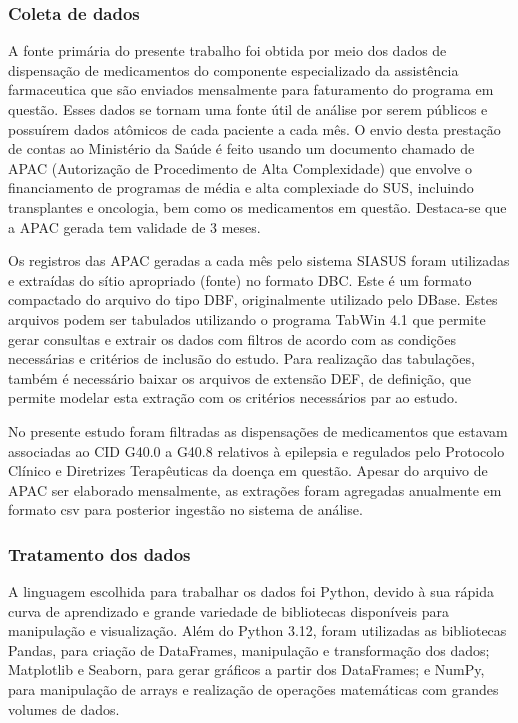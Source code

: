 \documentclass[article,a4paper,12pt,brazil,sumario=tradicional]{abntex2}
\begin{document}
\subsubsection{Coleta de dados}

A fonte primária do presente trabalho foi obtida por meio dos dados de dispensação de medicamentos do componente especializado da assistência farmaceutica que são enviados mensalmente para faturamento do programa em questão. Esses dados se tornam uma fonte útil de análise por serem públicos e possuírem dados atômicos de cada paciente a cada mês. O envio desta prestação de contas ao Ministério da Saúde é feito usando um documento chamado de APAC (Autorização de Procedimento de Alta Complexidade) que envolve o financiamento de programas de média e alta complexiade do SUS, incluindo transplantes e oncologia, bem como os medicamentos em questão. Destaca-se que a APAC gerada tem validade de 3 meses.

Os registros das APAC geradas a cada mês pelo sistema SIASUS foram utilizadas e extraídas do sítio apropriado (fonte) no formato DBC. Este é um formato compactado do arquivo do tipo DBF, originalmente utilizado pelo DBase. Estes arquivos podem ser tabulados utilizando o programa TabWin 4.1 que permite gerar consultas e extrair os dados com filtros de acordo com as condições necessárias e critérios de inclusão do estudo. Para realização das tabulações, também é necessário baixar os arquivos de extensão DEF, de definição, que permite modelar esta extração com os critérios necessários par ao estudo.

No presente estudo foram filtradas as dispensações de medicamentos que estavam associadas ao CID G40.0 a G40.8 relativos à epilepsia e regulados pelo Protocolo Clínico e Diretrizes Terapêuticas da doença em questão. Apesar do arquivo de APAC ser elaborado mensalmente, as extrações foram agregadas anualmente em formato csv para posterior ingestão no sistema de análise.

\subsubsection{Tratamento dos dados}
 
A linguagem escolhida para trabalhar os dados foi Python, devido à sua rápida curva de aprendizado e grande variedade de bibliotecas disponíveis para manipulação e visualização. Além do Python 3.12, foram utilizadas as bibliotecas Pandas, para criação de DataFrames, manipulação e transformação dos dados; Matplotlib e Seaborn, para gerar gráficos a partir dos DataFrames; e NumPy, para manipulação de arrays e realização de operações matemáticas com grandes volumes de dados.
\end{document}
